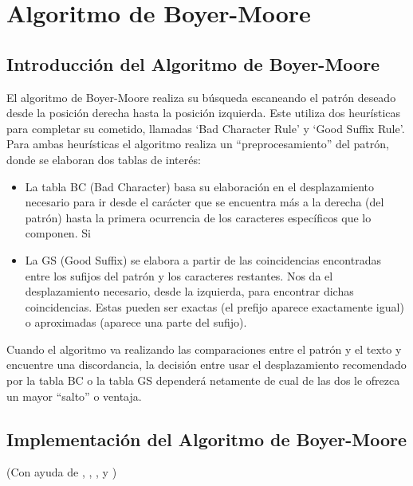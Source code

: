 
\section*{Algoritmo de Boyer-Moore}
{}

\subsection*{Introducción del Algoritmo de Boyer-Moore}

El algoritmo de Boyer-Moore realiza su búsqueda escaneando el patrón deseado desde la posición derecha hasta la posición izquierda. Este utiliza dos heurísticas para completar su cometido, llamadas ‘Bad Character Rule’ y ‘Good Suffix Rule’.
Para ambas heurísticas el algoritmo realiza un “preprocesamiento” del patrón, donde se elaboran dos tablas de interés:
\begin{itemize}
    \item La tabla BC (Bad Character) basa su elaboración en el desplazamiento necesario para ir desde el carácter que se encuentra más a la derecha (del patrón) hasta la primera ocurrencia de los caracteres específicos que lo componen. Si 
    \item La GS (Good Suffix) se elabora a partir de las coincidencias encontradas entre los sufijos del patrón y los caracteres restantes. Nos da el desplazamiento necesario, desde la izquierda, para encontrar dichas coincidencias. Estas pueden ser exactas (el prefijo aparece exactamente igual) o aproximadas (aparece una parte del sufijo).
\end{itemize}

Cuando el algoritmo va realizando las comparaciones entre el patrón y el texto y encuentre una discordancia, la decisión entre usar el desplazamiento recomendado por la tabla BC o la tabla GS dependerá netamente de cual de las dos le ofrezca un mayor “salto” o ventaja.

\subsection*{Implementación del Algoritmo de Boyer-Moore}
(Con ayuda de \cite{boyer-moor_algorithm_1997}, \cite{101145359842359859}, \cite{gusfield_1997}, \cite{exactOnline} y \cite{pdfBoyer})

